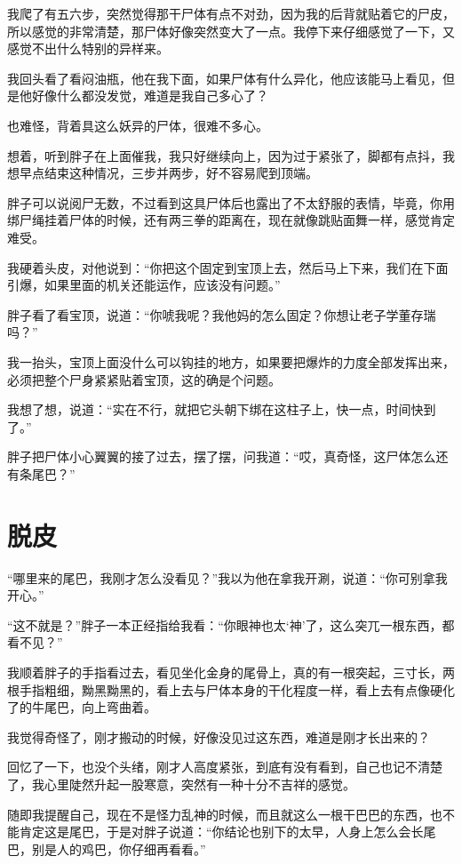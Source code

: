 我爬了有五六步，突然觉得那干尸体有点不对劲，因为我的后背就贴着它的尸皮，所以感觉的非常清楚，那尸体好像突然变大了一点。我停下来仔细感觉了一下，又感觉不出什么特别的异样来。

我回头看了看闷油瓶，他在我下面，如果尸体有什么异化，他应该能马上看见，但是他好像什么都没发觉，难道是我自己多心了？

也难怪，背着具这么妖异的尸体，很难不多心。

想着，听到胖子在上面催我，我只好继续向上，因为过于紧张了，脚都有点抖，我想早点结束这种情况，三步并两步，好不容易爬到顶端。

胖子可以说阅尸无数，不过看到这具尸体后也露出了不太舒服的表情，毕竟，你用绑尸绳挂着尸体的时候，还有两三拳的距离在，现在就像跳贴面舞一样，感觉肯定难受。

我硬着头皮，对他说到：“你把这个固定到宝顶上去，然后马上下来，我们在下面引爆，如果里面的机关还能运作，应该没有问题。”

胖子看了看宝顶，说道：“你唬我呢？我他妈的怎么固定？你想让老子学董存瑞吗？”

我一抬头，宝顶上面没什么可以钩挂的地方，如果要把爆炸的力度全部发挥出来，必须把整个尸身紧紧贴着宝顶，这的确是个问题。

我想了想，说道：“实在不行，就把它头朝下绑在这柱子上，快一点，时间快到了。”

胖子把尸体小心翼翼的接了过去，摆了摆，问我道：“哎，真奇怪，这尸体怎么还有条尾巴？”

\chapter{脱皮}

“哪里来的尾巴，我刚才怎么没看见？”我以为他在拿我开涮，说道：“你可别拿我开心。”

“这不就是？”胖子一本正经指给我看：“你眼神也太‘神’了，这么突兀一根东西，都看不见？”

我顺着胖子的手指看过去，看见坐化金身的尾骨上，真的有一根突起，三寸长，两根手指粗细，黝黑黝黑的，看上去与尸体本身的干化程度一样，看上去有点像硬化了的牛尾巴，向上弯曲着。

我觉得奇怪了，刚才搬动的时候，好像没见过这东西，难道是刚才长出来的？

回忆了一下，也没个头绪，刚才人高度紧张，到底有没有看到，自己也记不清楚了，我心里陡然升起一股寒意，突然有一种十分不吉祥的感觉。

随即我提醒自己，现在不是怪力乱神的时候，而且就这么一根干巴巴的东西，也不能肯定这是尾巴，于是对胖子说道：“你结论也别下的太早，人身上怎么会长尾巴，别是人的鸡巴，你仔细再看看。”

